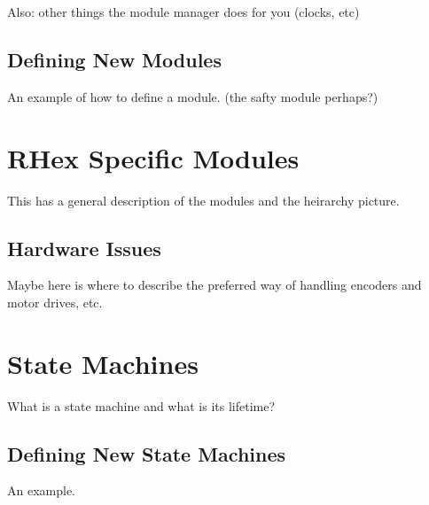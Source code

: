 \documentclass[12pt, letterpaper]{article}
\begin{document}
Also: other things the module manager does for you (clocks, etc)

\subsection{Defining New Modules}

An example of how to define a module. (the safty module perhaps?)

\section{RHex Specific Modules}

This has a general description of the modules and the heirarchy picture.

\subsection{Hardware Issues}

Maybe here is where to describe the preferred way of handling encoders and motor drives, etc.

\section{State Machines}

What is a state machine and what is its lifetime?

\subsection{Defining New State Machines}

An example.
\end{document}
